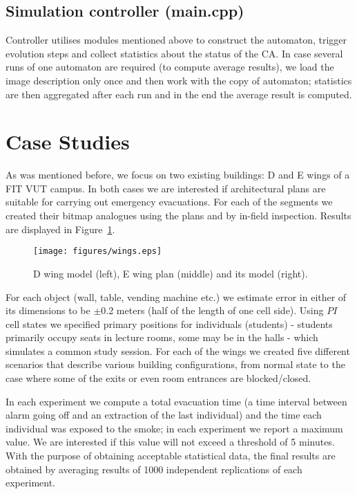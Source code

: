 \subsection{Simulation controller (main.cpp)}
Controller utilises modules mentioned above to construct the automaton,
trigger evolution steps and collect statistics about the status of the CA.
In case several runs of one automaton are required (to compute average
results), we load the image description only once and then work with
the copy of automaton; statistics are then aggregated after each run and
in the end the average result is computed.

\section{Case Studies}
As was mentioned before, we focus on two existing buildings: D and E wings of a 
FIT VUT campus.
In both cases we are interested if architectural plans are suitable for carrying
out emergency evacuations.
For each of the segments we created their bitmap analogues using the plans and
by in-field inspection.
Results are displayed in Figure~\ref{fig:wings}.

\begin{figure}
    \centering
    \texttt{[image: figures/wings.eps]}
    \caption{D wing model (left), E wing plan (middle) and its model (right).}
    \label{fig:wings}
\end{figure}

For each object (wall, table, vending machine etc.) we estimate error in either
of its dimensions to be $\pm$0.2 meters (half of the length of one cell side).
Using $PI$ cell states we specified primary positions for individuals
(students) - students primarily occupy seats in lecture rooms, some may be in
the halls - which simulates a common study session.
For each of the wings we created five different scenarios that describe
various building configurations, from normal state to the case where some of
the exits or even room entrances are blocked/closed.

In each experiment we compute a total evacuation time (a time interval between
alarm going off and an extraction of the last individual) and the time each
individual was exposed to the smoke;
in each experiment we report a maximum value.
We are interested if this value will not exceed a threshold of 5 minutes.
With the purpose of obtaining acceptable statistical data, the final results are
obtained by averaging results of 1000 independent replications of each
experiment.

